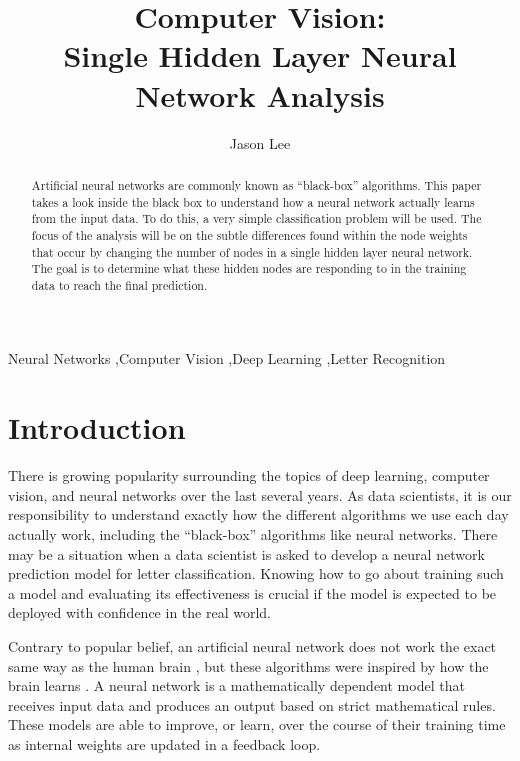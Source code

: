 \documentclass[5p,authoryear]{elsarticle}
\begin{document}
\begin{frontmatter}

\title{Computer Vision: \\Single Hidden Layer Neural Network Analysis}
\author{Jason Lee}
\address{Northwestern University, SPS \\Artificial Intelligence and Deep Learning \\2019FA MSDS 458-56}


\begin{abstract}
Artificial neural networks are commonly known as “black-box” algorithms. 
This paper takes a look inside the black box to understand how a neural network actually learns from the input data. 
To do this, a very simple classification problem will be used. 
The focus of the analysis will be on the subtle differences found within the node weights that occur by changing the number of nodes in a single hidden layer neural network. 
The goal is to determine what these hidden nodes are responding to in the training data to reach the final prediction.
\end{abstract}


\begin{keyword}
Neural Networks \sep Computer Vision \sep Deep Learning \sep Letter Recognition 
\end{keyword}

\end{frontmatter}


\section{Introduction}\label{introduction}


There is growing popularity surrounding the topics of deep learning, computer vision, and neural networks over the last several years. As data scientists, it is our responsibility to understand exactly how the different algorithms we use each day actually work, including the “black-box” algorithms like neural networks. 
There may be a situation when a data scientist is asked to develop a neural network prediction model for letter classification. 
Knowing how to go about training such a model and evaluating its effectiveness is crucial if the model is expected to be deployed with confidence in the real world. 

Contrary to popular belief, an artificial neural network does not work the exact same way as the human brain \citep{chollet}, but these algorithms were inspired by how the brain learns \citep{goodfellow}. 
A neural network is a mathematically dependent model that receives input data and produces an output based on strict mathematical rules. 
These models are able to improve, or learn, over the course of their training time as internal weights are updated in a feedback loop.
\end{document}

